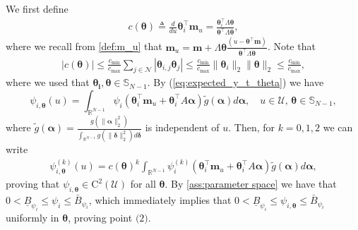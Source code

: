 \documentclass{article} %
\def\eqref#1{equation~\ref{#1}}
\renewcommand{\eqref}[1]{(\ref{#1})}
\begin{document}
We first define 
\begin{align}\label{eq:c_theta}
c(\boldsymbol{\theta}) \triangleq \frac{d}{du} \boldsymbol{\theta}_i^{\top}\mathbf{m}_u = \frac{\boldsymbol{\theta}_i^{\top}\Lambda \boldsymbol{\theta}}{\boldsymbol{\theta}^{\top}\Lambda \boldsymbol{\theta}},
\end{align}
where we recall from \cref{def:m_u} that $\mathbf{m}_u = \mathbf{m}+\Lambda \boldsymbol{\theta} \frac{\left(u-\boldsymbol{\theta}^{\top} \mathbf{m}\right)}{\boldsymbol{\theta}^{\top} \Lambda \boldsymbol{\theta}}$. 
Note that 
\begin{align}\label{c_theta_bound}
|c(\boldsymbol{\theta})| \leq \frac{c_{\min}}{c_{\max}} \sum_{j \in \mathcal{N}}|\boldsymbol{\theta}_{i,j}\boldsymbol{\theta}_j| \leq \frac{c_{\min}}{c_{\max}} \|\boldsymbol{\theta}_i\|_2 \|\boldsymbol{\theta} \|_2\leq \frac{c_{\min}}{c_{\max}},
\end{align}
where we used that $\boldsymbol{\theta_i},\boldsymbol{\theta} \in \mathbb{S}_{N-1}$. By \eqref{eq:expected_y_t_theta} we have \[
\psi_{i,\boldsymbol{\theta}}(u)= \int_{\mathbb{R}^{N-1}} \psi_i\left(\boldsymbol{\theta}_i^{\top}\mathbf{m}_u+\boldsymbol{\theta}_i^{\top}A \boldsymbol{\alpha}\right) \tilde{g}(\boldsymbol{\alpha})d\boldsymbol{\alpha}, \quad u \in \mathcal{U}, \, \boldsymbol{\theta} \in \mathbb{S}_{N-1},
\]
where
$\tilde{g}(\boldsymbol{\alpha})=\frac{g(\|\boldsymbol{\alpha}\|_2^2)}{\int_{\mathbb{R}^{N-1}} g(\|\boldsymbol{\delta}\|_2^2) d \boldsymbol{\delta}}$ is independent of $u$. Then, for $k = 0,1,2$ we can write
\begin{align}\label{eq:psi_theta_k}
\psi^{(k)}_{i,\boldsymbol{\theta}}(u) = c(\boldsymbol{\theta})^k\int_{\mathbb{R}^{N-1}} \psi_i^{(k)}\left(\boldsymbol{\theta}_i^{\top}\mathbf{m}_u+\boldsymbol{\theta}_i^{\top}A \boldsymbol{\alpha}\right) \tilde{g}(\boldsymbol{\alpha})d\boldsymbol{\alpha},
\end{align}
proving that $\psi_{i,\boldsymbol{\theta}}\in \mathrm{C}^2(\mathcal{U})$ for all $\boldsymbol{\theta}$. 
By \cref{ass:parameter space} we have that $0<\underline{B}_{\psi_i} \leq \psi_i\leq \bar{B}_{\psi_i}$, which immediately implies that $0<\underline{B}_{\psi_i} \leq \psi_{i,\boldsymbol{\theta}}\leq \bar{B}_{\psi_i}$ uniformly in $\boldsymbol{\theta}$, proving point $\textit{(2)}$. 
\end{document}
